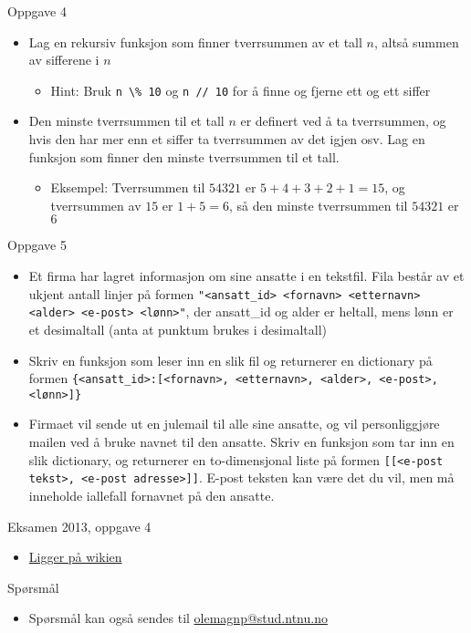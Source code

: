 \documentclass[screen, aspectratio=169]{beamer}
\begin{document}
\begin{frame}{Oppgave 4}
	\begin{itemize}
		\item<+-> Lag en rekursiv funksjon som finner tverrsummen av et tall $n$, altså summen av sifferene i $n$
		\begin{itemize}
			\item Hint: Bruk \lstinline|n \% 10| og \lstinline|n // 10| for å finne og fjerne ett og ett siffer
		\end{itemize}
		\item<+-> Den minste tverrsummen til et tall $n$ er definert ved å ta tverrsummen, og hvis den har mer enn et siffer ta tverrsummen av det igjen osv. Lag en funksjon som finner den minste tverrsummen til et tall.
		\begin{itemize}
			\item Eksempel: Tverrsummen til $54321$ er $5 + 4 + 3+2+1=15$, og tverrsummen av $15$ er $1+5=6$, så den minste tverrsummen til $54321$ er $6$
		\end{itemize}
	\end{itemize}
\end{frame}

\begin{frame}[fragile]{Oppgave 5}
	\begin{itemize}
		\item<+-> Et firma har lagret informasjon om sine ansatte i en tekstfil. Fila består av et ukjent antall linjer på formen \lstinline|"<ansatt_id> <fornavn> <etternavn> <alder> <e-post> <lønn>"|, der ansatt\_id og alder er heltall, mens lønn er et desimaltall (anta at punktum brukes i desimaltall)
		\item<+-> Skriv en funksjon som leser inn en slik fil og returnerer en dictionary på formen \lstinline|{<ansatt_id>:[<fornavn>, <etternavn>, <alder>, <e-post>, <lønn>]}|
		\item<+-> Firmaet vil sende ut en julemail til alle sine ansatte, og vil personliggjøre mailen ved å bruke navnet til den ansatte. Skriv en funksjon som tar inn en slik dictionary, og returnerer en to-dimensjonal liste på formen \lstinline|[[<e-post tekst>, <e-post adresse>]]|. E-post teksten kan være det du vil, men må inneholde iallefall fornavnet på den ansatte.
	\end{itemize}
\end{frame}

\begin{frame}{Eksamen 2013, oppgave 4}
	\begin{itemize}
		\item<+-> \href{https://www.ntnu.no/wiki/display/tdt4110/Python+eksamensoppgaver?preview=/78972128/79298911/Python\%202013.pdf}{Ligger på wikien}
	\end{itemize}
\end{frame}

\begin{frame}{Spørsmål}
	\begin{itemize}
		\item Spørsmål kan også sendes til \href{mailto::olemagnp@stud.ntnu.no}{olemagnp@stud.ntnu.no}
	\end{itemize}
\end{frame}
\end{document}
